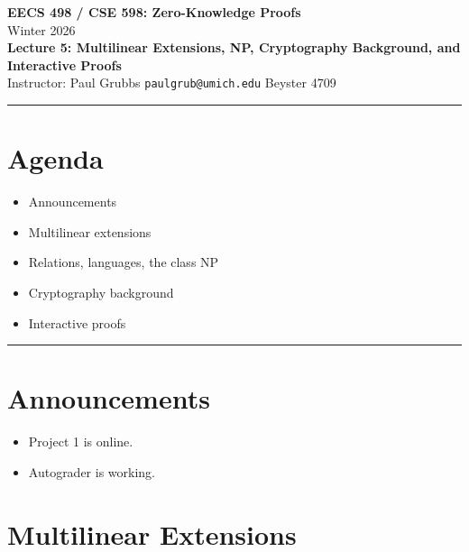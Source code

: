 \documentclass[11pt]{article}
\theoremstyle{plain}
\theoremstyle{definition}
\begin{document}
\begin{center}
  {\LARGE \textbf{EECS 498 / CSE 598: Zero-Knowledge Proofs}}\\[6pt]
  {\large Winter 2026}\\[4pt]
  {\large \textbf{Lecture 5: Multilinear Extensions, NP, Cryptography Background, and Interactive Proofs}}\\[4pt]
  {\large Instructor: Paul Grubbs \quad \texttt{paulgrub@umich.edu} \quad Beyster 4709}
\end{center}

\hrule
\vspace{1em}

\section*{Agenda}
\begin{itemize}[leftmargin=2em]
  \item Announcements
  \item Multilinear extensions
  \item Relations, languages, the class NP
  \item Cryptography background
  \item Interactive proofs
\end{itemize}

\hrule
\vspace{1em}

\section{Announcements}
\begin{itemize}[leftmargin=2em]
  \item Project 1 is online.
  \item Autograder is working.
\end{itemize}

\section{Multilinear Extensions}
\end{document}
